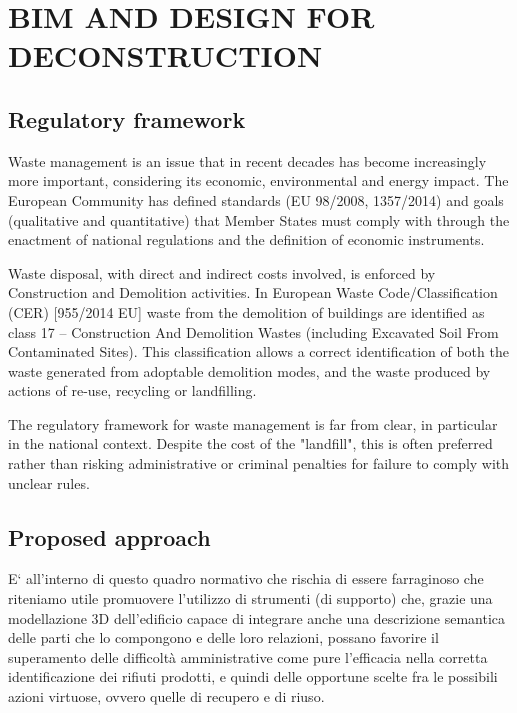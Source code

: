\section{\uppercase{BIM and Design for Deconstruction}}
\label{sec:deconstruction}


\subsection{Regulatory framework}

Waste management is an issue that in recent decades has become increasingly more important, considering its economic, environmental and energy  impact.
The European Community has defined standards (EU 98/2008, 1357/2014) and goals (qualitative and quantitative) that Member States must comply with through the enactment of national regulations and the definition of economic instruments.

Waste disposal, with direct and indirect costs involved, is enforced by Construction and Demolition activities. In European Waste Code/Classification (CER) [955/2014 EU] waste from the demolition of buildings are identified as class 17 -- Construction And Demolition Wastes (including Excavated Soil From Contaminated Sites). 
This classification allows a correct identification of both the waste generated from adoptable demolition modes, and the waste produced by actions of re-use, recycling or landfilling.
 
The regulatory framework for waste management is far from clear, in particular in the national context. Despite the cost of the "landfill", this is often preferred rather than risking administrative or criminal penalties for failure to comply with unclear rules.  


\subsection{Proposed approach}




E` all’interno di questo quadro normativo che rischia di essere farraginoso che riteniamo utile promuovere l’utilizzo di strumenti (di supporto) che, grazie una modellazione 3D dell’edificio capace di integrare anche una descrizione semantica delle parti che lo compongono e delle loro relazioni, possano favorire il superamento delle difficoltà amministrative come pure l’efficacia nella corretta identificazione dei rifiuti prodotti, e quindi delle opportune scelte fra le possibili azioni virtuose, ovvero quelle di recupero e di riuso.

